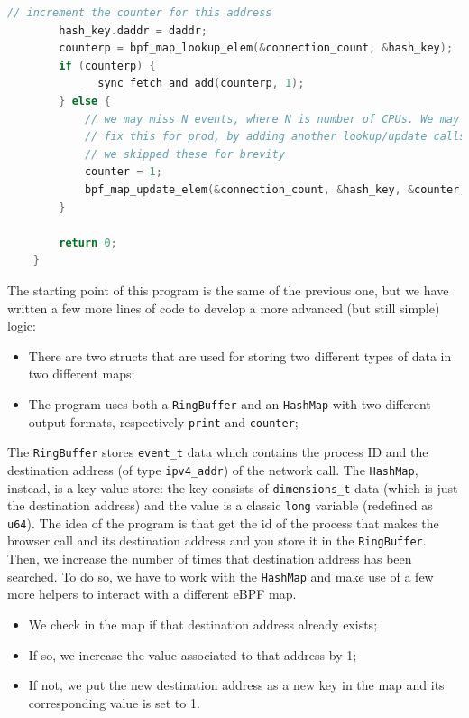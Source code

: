 \begin{lstlisting}[language=C, caption={bee complete program}]
		// increment the counter for this address
		hash_key.daddr = daddr;
		counterp = bpf_map_lookup_elem(&connection_count, &hash_key);
		if (counterp) {
			__sync_fetch_and_add(counterp, 1);
		} else {
			// we may miss N events, where N is number of CPUs. We may want to 
			// fix this for prod, by adding another lookup/update calls here.
			// we skipped these for brevity
			counter = 1;
			bpf_map_update_elem(&connection_count, &hash_key, &counter, BPF_NOEXIST);
		}
		
		return 0;
	}
\end{lstlisting}

The starting point of this program is the same of the previous one, but we have written a few more lines of code to develop a more advanced (but still simple) logic:

\begin{itemize}
	\item There are two structs that are used for storing two different types of data
		in two different maps;
	\item The program uses both a \verb|RingBuffer| and an \verb|HashMap| with two
		different output formats, respectively \verb|print| and \verb|counter|;
\end{itemize}

The \verb|RingBuffer| stores \verb|event_t| data which contains the process ID and the destination address (of type \verb|ipv4_addr|) of the network call.
The \verb|HashMap|, instead, is a key-value store: the key consists of \verb|dimensions_t| data (which is just the destination address) and the value is a classic \verb|long| variable (redefined as \verb|u64|).
The idea of the program is that get the id of the process that makes the browser call and its destination address and you store it in the \verb|RingBuffer|.
Then, we increase the number of times that destination address has been searched.
To do so, we have to work with the \verb|HashMap| and make use of a few more helpers to interact with a different eBPF map. 

\begin{itemize}
	\item We check in the map if that destination address already exists;
	\item If so, we increase the value associated to that address by 1;
	\item If not, we put the new destination address as a new key in the map and its
		corresponding value is set to 1.
\end{itemize}

